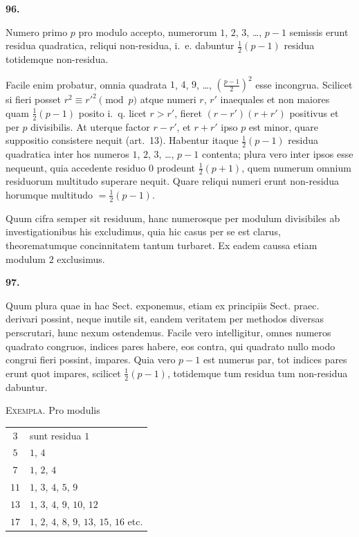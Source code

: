 \documentclass[12pt,a4paper]{article}
\theoremstyle{plain}
\theoremstyle{definition}
\theoremstyle{remark}
\begin{document}
\setcounter{satz}{96}
\addtocounter{satz}{-1}
\textbf{96.}

Numero primo $p$ pro modulo accepto, numerorum $1$, $2$, $3$, \ldots, $p-1$ semissis erunt residua quadratica, reliqui non-residua, i.~e. dabuntur $\frac{1}{2}(p-1)$ residua totidemque non-residua.

Facile enim probatur, omnia quadrata $1$, $4$, $9$, \ldots, $(\frac{p-1}{2})^2$ esse incongrua. Scilicet si fieri posset $r^2 \equiv r'^2 \pmod{p}$ atque numeri $r$, $r'$ inaequales et non maiores quam $\frac{1}{2}(p-1)$ posito i.~q. licet $r>r'$, fieret $(r-r')(r+r')$ positivus et per $p$ divisibilis. At uterque factor $r-r'$, et $r+r'$ ipso $p$ est minor, quare suppositio consistere nequit (art.~13). Habentur itaque $\frac{1}{2}(p-1)$ residua quadratica inter hos numeros $1$, $2$, $3$, \ldots, $p-1$ contenta; plura vero inter ipsos esse nequeunt, quia accedente residuo $0$ prodeunt $\frac{1}{2}(p+1)$, quem numerum omnium residuorum multitudo superare nequit. Quare reliqui numeri erunt non-residua horumque multitudo $=\frac{1}{2}(p-1)$.

Quum cifra semper sit residuum, hanc numerosque per modulum divisibiles ab investigationibus his excludimus, quia hic casus per se est clarus, theorematumque concinnitatem tantum turbaret. Ex eadem caussa etiam modulum $2$ exclusimus.

\setcounter{satz}{97}
\addtocounter{satz}{-1}
\textbf{97.}

Quum plura quae in hac Sect. exponemus, etiam ex principiis Sect. praec. derivari possint, neque inutile sit, eandem veritatem per methodos diversas perscrutari, hunc nexum ostendemus. Facile vero intelligitur, omnes numeros quadrato congruos, indices pares habere, eos contra, qui quadrato nullo modo congrui fieri possint, impares. Quia vero $p-1$ est numerus par, tot indices pares erunt quot impares, scilicet $\frac{1}{2}(p-1)$, totidemque tum residua tum non-residua dabuntur.

\textsc{Exempla.} Pro modulis

\begin{tabular}{c|l}
$3$ & sunt residua $1$ \\
$5$ & $1$, $4$ \\
$7$ & $1$, $2$, $4$ \\
$11$ & $1$, $3$, $4$, $5$, $9$ \\
$13$ & $1$, $3$, $4$, $9$, $10$, $12$ \\
$17$ & $1$, $2$, $4$, $8$, $9$, $13$, $15$, $16$ etc.
\end{tabular}
\end{document}
